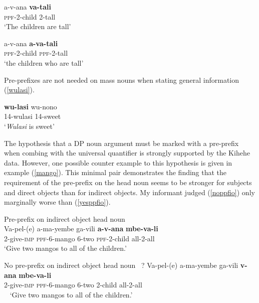 \documentclass[letterpaper, 12pt]{article}
\begin{document}
\begin{exe}
\singlespacing
\ex \label{tall} \begin{xlist}

\ex \gll a-v-ana \textbf{va-tali} \\
\textsc{ppf}-2-child 2-tall  \\
`The children are tall'


\ex \gll a-v-ana \textbf{a-va-tali} \\
\textsc{ppf}-2-child \textsc{ppf}-2-tall \\
`the children who are tall'

\end{xlist}
\end{exe}

Pre-prefixes are not needed on mass nouns when stating general information (\ref{wulasi}). 


\begin{exe}

\ex \label{wulasi} \gll \textbf{wu-lasi} wu-nono \\
14-wulasi 14-sweet \\
`\textit{Wulasi} is sweet'

\end{exe}

The hypothesis that a DP noun argument must be marked with a pre-prefix when combing with the universal quantifier is strongly supported by the Kihehe data.  However, one possible counter example to this hypothesis is given in example (\ref{mango}). This minimal pair demonstrates the finding that the requirement of the pre-prefix on the head noun seems to be stronger for subjects and direct objects than for indirect objects.  My informant judged (\ref{noppfio}) only marginally worse than (\ref{yesppfio}). 

\begin{exe} 
\singlespacing
\ex  \label{mango} \begin{xlist}

\ex Pre-prefix on indirect object head noun \\
\gll Va-pel-(e) a-ma-yembe ga-vili \textbf{a-v-ana} \textbf{mbe-va-li} \\
2-give-\textsc{imp} \textsc{ppf}-6-mango 6-two \textsc{ppf}-2-child all-2-all\\ 
\vspace{-1.25ex}
`Give two mangos to all of the children.' \\ \label{yesppfio} 

\vspace{5mm}

\ex No pre-prefix on indirect object head noun \
\gll ? Va-pel-(e) a-ma-yembe ga-vili \textbf{v-ana} \textbf{mbe-va-li} \\
{} 2-give-\textsc{imp} \textsc{ppf}-6-mango 6-two 2-child all-2-all\\ \label{noppfio}\
\vspace{-1.25ex}
`Give two mangos to all of the children.'

\end{xlist}
\end{exe}
\end{document}
